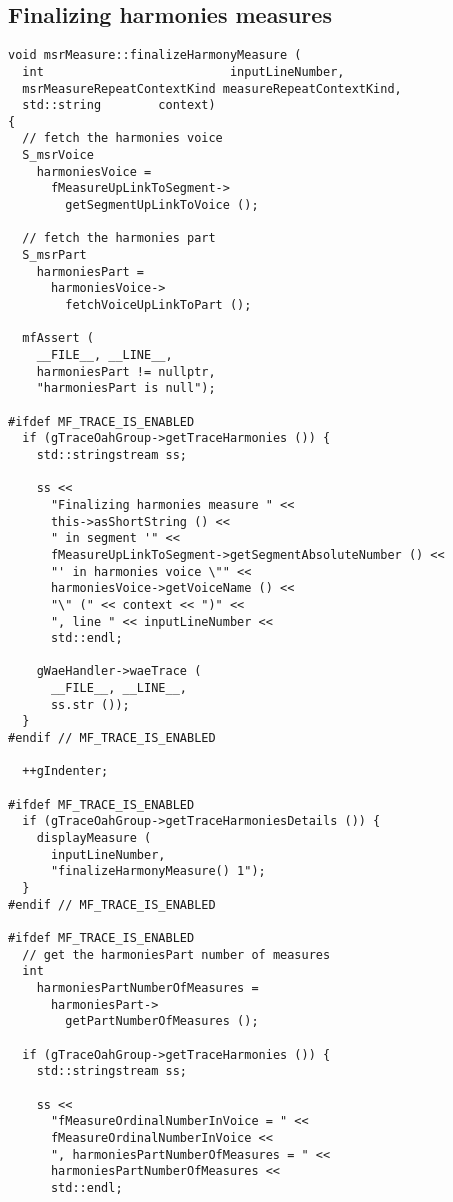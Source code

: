 \subsection{Finalizing harmonies measures}

\begin{lstlisting}[language=CPlusPlus]
void msrMeasure::finalizeHarmonyMeasure (
  int                          inputLineNumber,
  msrMeasureRepeatContextKind measureRepeatContextKind,
  std::string        context)
{
  // fetch the harmonies voice
  S_msrVoice
    harmoniesVoice =
      fMeasureUpLinkToSegment->
        getSegmentUpLinkToVoice ();

  // fetch the harmonies part
  S_msrPart
    harmoniesPart =
      harmoniesVoice->
        fetchVoiceUpLinkToPart ();

  mfAssert (
    __FILE__, __LINE__,
    harmoniesPart != nullptr,
    "harmoniesPart is null");

#ifdef MF_TRACE_IS_ENABLED
  if (gTraceOahGroup->getTraceHarmonies ()) {
    std::stringstream ss;

    ss <<
      "Finalizing harmonies measure " <<
      this->asShortString () <<
      " in segment '" <<
      fMeasureUpLinkToSegment->getSegmentAbsoluteNumber () <<
      "' in harmonies voice \"" <<
      harmoniesVoice->getVoiceName () <<
      "\" (" << context << ")" <<
      ", line " << inputLineNumber <<
      std::endl;

    gWaeHandler->waeTrace (
      __FILE__, __LINE__,
      ss.str ());
  }
#endif // MF_TRACE_IS_ENABLED

  ++gIndenter;

#ifdef MF_TRACE_IS_ENABLED
  if (gTraceOahGroup->getTraceHarmoniesDetails ()) {
    displayMeasure (
      inputLineNumber,
      "finalizeHarmonyMeasure() 1");
  }
#endif // MF_TRACE_IS_ENABLED

#ifdef MF_TRACE_IS_ENABLED
  // get the harmoniesPart number of measures
  int
    harmoniesPartNumberOfMeasures =
      harmoniesPart->
        getPartNumberOfMeasures ();

  if (gTraceOahGroup->getTraceHarmonies ()) {
    std::stringstream ss;

    ss <<
      "fMeasureOrdinalNumberInVoice = " <<
      fMeasureOrdinalNumberInVoice <<
      ", harmoniesPartNumberOfMeasures = " <<
      harmoniesPartNumberOfMeasures <<
      std::endl;


\end{lstlisting}
